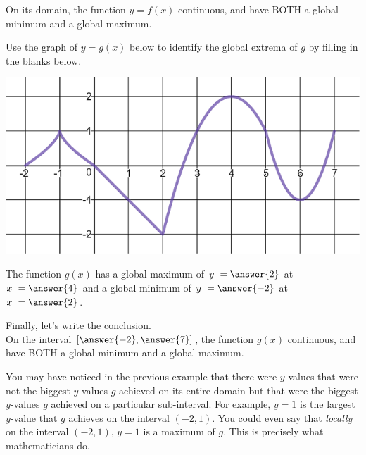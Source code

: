 \documentclass{ximera}
\begin{document}
\begin{exercise}
\begin{exercise}
\begin{exercise}
On its domain, the function $y=f(x)$  continuous, and  have BOTH a global minimum and a global maximum.  
\end{exercise}
\end{exercise}
\end{exercise}

\begin{exercise}
Use the graph of $y = g(x)$ below to identify the global extrema of $g$ by filling in the blanks below. 

\begin{center} \includegraphics[scale=0.5]{extrema3new.png} \end{center}

The function $g(x)$ has a global maximum of $y \ = \answer{2}$ at $x \ = \answer{4}$ and a global minimum of $y \ = \answer{-2}$ at $x \ = \answer{2}$.

\begin{exercise}
Finally, let's write the conclusion.  \\

On the  interval $\left[ \answer{-2}, \answer{7}\right]$, the function $g(x)$  continuous, and  have BOTH a global minimum and a global maximum. 
\end{exercise}
\end{exercise}

You may have noticed in the previous example that there were $y$ values that were not the biggest $y$-values $g$ achieved on its entire domain but that were the biggest $y$-values $g$ achieved on a particular sub-interval.  For example, $y=1$ is the largest $y$-value that $g$ achieves on the interval $(-2, 1)$.  You could even say that \textit{locally} on the interval $(-2,1)$, $y=1$ is a maximum of $g$.  This is precisely what mathematicians do.  
\end{document}
